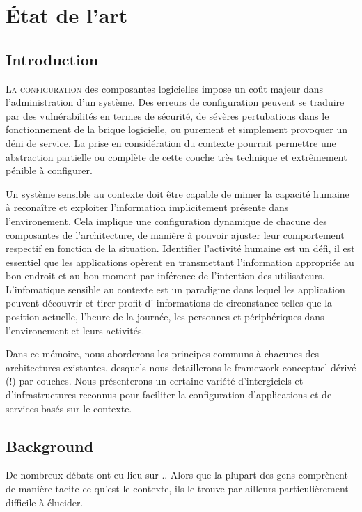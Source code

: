 \chapter{État de l'art}

\section{Introduction}

\lettrine{L}{a configuration} des composantes logicielles impose un coût majeur
dans l'administration d'un système. Des erreurs de configuration peuvent se
traduire par des vulnérabilités en termes de sécurité, de sévères pertubations
dans le fonctionnement de la brique logicielle, ou purement et simplement
provoquer un déni de service. La prise en considération du contexte pourrait
permettre une abstraction partielle ou complète de cette couche très technique
et extrêmement pénible à configurer.

Un système sensible au contexte doit être capable de mimer la capacité humaine à
reconaître et exploiter l'information implicitement présente dans
l'environement. Cela implique une configuration dynamique de chacune des
composantes de l'architecture, de manière à pouvoir ajuster leur comportement
respectif en fonction de la situation. Identifier l'activité humaine est un
défi, il est essentiel que les applications opèrent en transmettant
l'information appropriée au bon endroit et au bon moment par inférence de
l'intention des utilisateurs. L'infomatique sensible au contexte est un
paradigme dans lequel les application peuvent découvrir et tirer profit d'
informations de circonstance telles que la position actuelle, l'heure de la
journée, les personnes et périphériques dans l'environement et leurs activités.

Dans ce mémoire, nous aborderons les principes communs à chacunes des
architectures existantes, desquels nous detaillerons le framework conceptuel
dérivé (!) par couches. Nous présenterons un certaine variété d'intergiciels et
d'infrastructures reconnus pour faciliter la configuration d'applications et de
services basés sur le contexte.

\section{Background}

De nombreux débats ont eu lieu sur .. Alors que la plupart des gens comprènent
de manière tacite ce qu'est le contexte, ils le trouve par ailleurs
particulièrement difficile à élucider.

